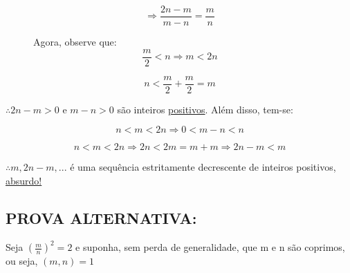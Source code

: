 \documentclass[a4paper, 12pt]{article}
\begin{document}
    \[\Rightarrow \frac{2n-m}{m-n} = \frac{m}{n}\]
    \begin{figure} [h!]
        \begin{minipage}[!] {0.4\linewidth}
            \caption{}
        \end{minipage}
        \begin{minipage}[!] {0.4\linewidth}
            {Agora, observe que:}
            \[\frac{m}{2} < n \Rightarrow m < 2n\]
    
            \[n < \frac{m}{2} + \frac{m}{2} = m\]
        \end{minipage}
    \end{figure} 
    
    \newpage
    {$\therefore 2n-m > 0$ e $ m-n > 0$ são inteiros \underline{positivos}. Além disso, tem-se:}
    
    \[n < m < 2n \Rightarrow 0 < m-n < n\]
    
    \[n < m < 2n \Rightarrow 2n < 2m = m + m \Rightarrow 2n - m < m\]
    
    
    {$\therefore m, 2n-m,...$ é uma sequência estritamente decrescente de inteiros positivos, \underline{absurdo!}}
    \subsection{PROVA ALTERNATIVA:} 

    
    {Seja $(\frac{m}{n})^2 = 2$ e suponha, sem perda de generalidade, que m e n são coprimos, ou seja, $(m,n)=1$}
    
\end{document}
